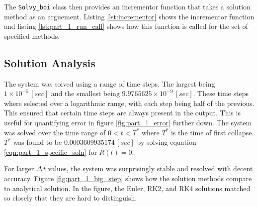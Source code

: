 \documentclass[12pt]{article}
\begin{document}
The \texttt{Solvy\_boi} class then provides an incrementor function that takes a solution method as an arguement. Listing \ref{lst:incrementor} shows the incrementor function and listing \ref{lst:part_1_run_call} shows how this function is called for the set of specified methods.


                 


\subsection{Solution Analysis} \label{sec:part_1_analysis}
The system was solved using a range of time steps. The largest being $1\times10^{-5} \,[sec]$  and the smallest being $9.9765625\times10^{-9}\, [sec]$. These time steps where selected over a logarithmic range, with each step being half of the previous. This ensured that certain time steps are always present in the output. This is useful for quantifying error in figure \ref{fig:part_1_error} further down. The system was solved over the time range of $0 < t < T^*$ where $T^*$ is the time of first collapse. $T^*$ was found to be $0.0003609935174 \, [sec]$ by solving equation \ref{eqn:part_1_specific_soln} for $R(t) = 0$.

For larger $\Delta \, t$ values, the system was surprisingly stable and resolved with decent accuracy. Figure \ref{fig:part_1_big_step} shows how the solution methods compare to analytical solution. In the figure, the Euler, RK2, and RK4 solutions matched so closely that they are hard to distinguish. 
\end{document}
